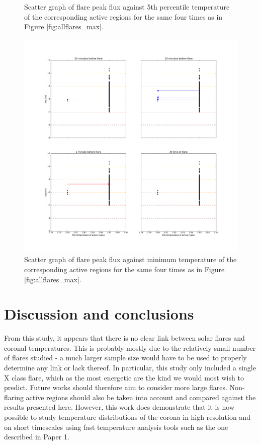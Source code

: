 \documentclass[referee,a4paper,12pt]{swsc}
\begin{document}
\begin{linenumbers}
\begin{figure}
	\caption{Scatter graph of flare peak flux against 5th percentile temperature of the corresponding active regions for the same four times as in Figure \ref{fig:allflares_max}.}
	\label{fig:allflares_p5}
\end{figure}
\begin{figure}
	\centering
		\includegraphics[width=0.9\columnwidth]{tempplots_min/allflares.png}
	\caption{Scatter graph of flare peak flux against minimum temperature of the corresponding active regions for the same four times as in Figure \ref{fig:allflares_max}.}
	\label{fig:allflares_min}
\end{figure}

\section{Discussion and conclusions}
From this study, it appears that there is no clear link between solar flares and coronal temperatures.
This is probably mostly due to the relatively small number of flares studied - a much larger sample size would have to be used to properly determine any link or lack thereof.
In particular, this study only included a single X class flare, which as the most energetic are the kind we would most wish to predict.
Future works should therefore aim to consider more large flares.
Non-flaring active regions should also be taken into account and compared against the results presented here.
However, this work does demonstrate that it is now possible to study temperature distributions of the corona in high resolution and on short timescales using fast temperature analysis tools such as the one described in Paper 1.


\end{linenumbers}
\end{document}

